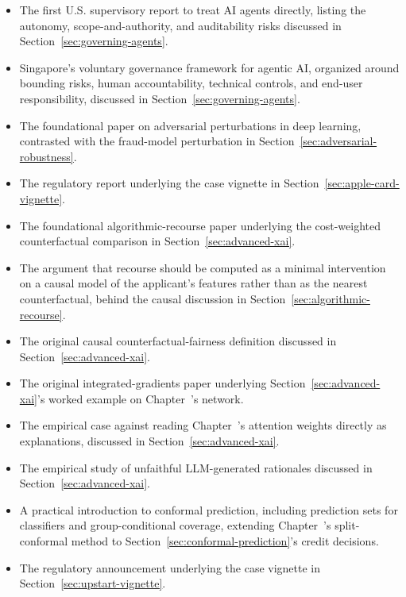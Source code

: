 \documentclass[../ai_in_finance]{subfiles}
\begin{document}
\begin{itemize}
    \item {} The first U.S. supervisory report to treat AI agents directly, listing the autonomy, scope-and-authority, and auditability risks discussed in Section~\ref{sec:governing-agents}.
    \item {} Singapore's voluntary governance framework for agentic AI, organized around bounding risks, human accountability, technical controls, and end-user responsibility, discussed in Section~\ref{sec:governing-agents}.
    \item {} The foundational paper on adversarial perturbations in deep learning, contrasted with the fraud-model perturbation in Section~\ref{sec:adversarial-robustness}.
    \item {} The regulatory report underlying the case vignette in Section~\ref{sec:apple-card-vignette}.
    \item {} The foundational algorithmic-recourse paper underlying the cost-weighted counterfactual comparison in Section~\ref{sec:advanced-xai}.
    \item {} The argument that recourse should be computed as a minimal intervention on a causal model of the applicant's features rather than as the nearest counterfactual, behind the causal discussion in Section~\ref{sec:algorithmic-recourse}.
    \item {} The original causal counterfactual-fairness definition discussed in Section~\ref{sec:advanced-xai}.
    \item {} The original integrated-gradients paper underlying Section~\ref{sec:advanced-xai}'s worked example on Chapter~'s network.
    \item {} The empirical case against reading Chapter~'s attention weights directly as explanations, discussed in Section~\ref{sec:advanced-xai}.
    \item {} The empirical study of unfaithful LLM-generated rationales discussed in Section~\ref{sec:advanced-xai}.
    \item {} A practical introduction to conformal prediction, including prediction sets for classifiers and group-conditional coverage, extending Chapter~'s split-conformal method to Section~\ref{sec:conformal-prediction}'s credit decisions.
    \item {} The regulatory announcement underlying the case vignette in Section~\ref{sec:upstart-vignette}.
\end{itemize}
\end{document}
